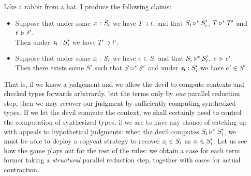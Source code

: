 \documentclass[format=acmsmall, screen, review, anonymous, timestamp]{acmart}
\newcommand{\V}[1]{\purple{\mathit{#1}}}
\newcommand{\x}[1]{\V{x_{\mathrm{#1}}}}
\begin{document}
Like a rabbit from a hat, I produce the following claims:
\begin{itemize}
\item Suppose that under some $\x{i} : S_i$ we have $T\ni t$, and that $S_i \triangleright^\ast S'_i$, $T \triangleright^\ast T'$ and $t\:\triangleright\,t'$.\\Then under $\x{i} : S'_i$ we have $T'\ni t'$.
\item Suppose that under some $\x{i} : S_i$ we have $e\in S$, and that $S_i \triangleright^\ast S'_i$, $e\:\triangleright\,e'$.\\Then there exists some $S'$ such that $S \triangleright^\ast S'$ and under $\x{i} : S'_i$ we have $e'\in S'$.
\end{itemize}
That is, if we know a judgement and we allow the devil to compute contexts and checked types forwards arbitrarily, but the terms only by \emph{one} parallel reduction step, then we may recover our judgment by sufficiently computing synthesized types. If we let the devil compute the context, we shall certainly need to control the computation of synthesized types, if we are to have any chance of catching up with appeals to hypothetical judgments: when the devil computes $S_i \triangleright^\ast S'_i$, we must be able to deploy a copycat strategy to recover $\x{i}\in S_i$ as $\x{i}\in S'_i$. Let us see how the game plays out for the rest of the rules: we obtain a case for each term former taking a \emph{structural} parallel reduction step, together with cases for actual contraction.
\end{document}
